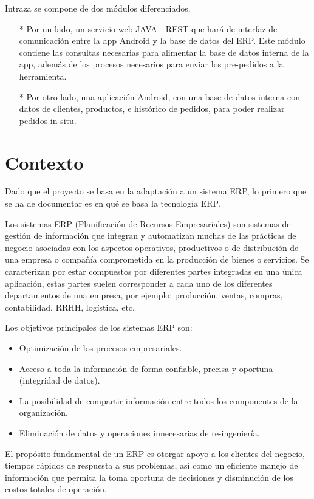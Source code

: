 Intraza se compone de dos módulos diferenciados.
	\begin{itemize}
		\item[*] Por un lado, un servicio web JAVA - REST que hará de interfaz de comunicación entre la app Android y la base de datos del ERP.  Este módulo contiene las consultas necesarias para alimentar la base de datos interna de la app, además de los procesos necesarios para enviar los pre-pedidos a la herramienta.
		\item[*]	Por otro lado, una aplicación Android, con una base de datos interna con datos de clientes, productos, e histórico de pedidos, para poder realizar pedidos in situ.
	\end{itemize}

\section{Contexto}
Dado que el proyecto se basa en la adaptación a un sistema ERP, lo primero que se ha de documentar es en qué se basa la tecnología ERP. 

Los sistemas ERP (Planificación de Recursos Empresariales) son sistemas de gestión de información que integran y automatizan muchas de las prácticas de negocio asociadas con los aspectos operativos, productivos o de distribución de una empresa o compañía comprometida en la producción de bienes o servicios. Se caracterizan por estar compuestos por diferentes partes integradas en una única aplicación, estas partes suelen corresponder a cada uno de los diferentes departamentos de una empresa, por ejemplo: producción, ventas, compras, contabilidad, RRHH, logística, etc. 

Los objetivos principales de los sistemas ERP son: 

\begin{itemize}
	\item Optimización de los procesos empresariales. 
	\item Acceso a toda la información de forma confiable, precisa y oportuna (integridad de datos). 
	\item La posibilidad de compartir información entre todos los componentes de la organización. 
	\item Eliminación de datos y operaciones innecesarias de re-ingeniería. 
\end{itemize}

El propósito fundamental de un ERP es otorgar apoyo a los clientes del negocio, tiempos rápidos de respuesta a sus problemas, así como un eficiente manejo de información que permita la toma oportuna de decisiones y disminución de los costos totales de operación. 

